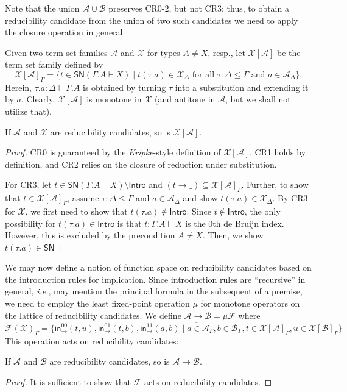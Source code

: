 \documentclass[a4paper,USenglish,cleveref, autoref, thm-restate]{lipics-v2019}
\newcommand{\ie}{\emph{i.e.}\xspace}
\newcommand{\tin}{\ensuremath{\mathsf{in}}}
\newcommand{\inn}[2]{\tin_{#1}^{#2}}
\newcommand{\red}[1][]{\longrightarrow_{#1}}
\newcommand{\cl}[1]{\overline{#1}}
\newcommand{\A}{\mathcal{A}}
\newcommand{\B}{\mathcal{B}}
\newcommand{\F}{\mathcal{F}}
\newcommand{\X}{\mathcal{X}}
\newcommand{\SN}{\mathsf{SN}}
\newcommand{\Intro}{\mathsf{Intro}}
\begin{document}
Note that the union $\A \cup \B$ preserves CR0-2, but not CR3; thus,
to obtain a reducibility candidate from the union of two such
candidates we need to apply the closure operation in general.

Given two term set families $\A$ and $\X$ for types $A \not= X$,
resp., let $\X[\A]$ be the term set family defined by
\[
  \X[\A]_\Gamma =
  \{ t \in \SN(\Gamma.A \vdash X) \mid t(\tau.a) \in \X_\Delta
     \mbox{ for all } \tau : \Delta \leq \Gamma
     \mbox{ and } a \in \A_\Delta
  \}
  .
\]
Herein, $\tau.a : \Delta \vdash \Gamma.A$ is obtained by turning
$\tau$ into a substitution and extending it by $a$.
Clearly, $\X[\A]$ is monotone in $\X$ (and antitone in $\A$, but we
shall not utilize that).
\begin{lemma}[Abstraction]
  If $\A$ and $\X$ are reducibility candidates, so is $\X[\A]$.
\end{lemma}
\begin{proof}
  CR0 is guaranteed by the \emph{Kripke}-style definition of $\X[\A]$.
  CR1 holds by definition, and CR2 relies on the closure of reduction
  under substitution.

  For CR3, let $t \in \SN(\Gamma.A \vdash X) \setminus \Intro$ and
  $(t \red \_) \subseteq \X[\A]_\Gamma$.
  Further, to show that $t \in \X[\A]_\Gamma$, assume
  $\tau : \Delta \leq \Gamma$ and $a \in \A_\Delta$ and show
  $t(\tau.a) \in \X_\Delta$.
  By CR3 for $\X$, we first need to show that $t(\tau.a) \not\in
  \Intro$.  Since $t \not\in\Intro$, the only possibility for
  $t(\tau.a) \in \Intro$ is that $t : \Gamma.A \vdash X$ is the 0th de Bruijn index.
  However, this is excluded by the precondition $A \not=X$.
  Then, we show $t(\tau.a) \in \SN$
\end{proof}

We may now define a notion of function space on reducibility
candidates based on the introduction rules for implication.  Since
introduction rules are ``recursive'' in general, \ie, may mention the
principal formula in the subsequent of a premise, we need to employ
the least fixed-point operation $\mu$ for monotone operators on the
lattice of reducibility candidates.
We define $\A \to \B = \mu\F$ where
\[
  \F(\X)_\Gamma =
  \cl{\{
    \inn\to{00}(t,u),
    \inn\to{01}(t,b),
    \inn\to{11}(a,b) \mid
      a \in \A_\Gamma,
      b \in \B_\Gamma,
      t \in \X[\A]_\Gamma,
      u \in \X[\B]_\Gamma
  \}}
\]
This operation acts on reducibility candidates:
\begin{lemma}
  If $\A$ and $\B$ are reducibility candidates, so is $\A \to \B$.
\end{lemma}
\begin{proof}
  It is sufficient to show that $\F$ acts on reducibility candidates.
\end{proof}
\end{document}
